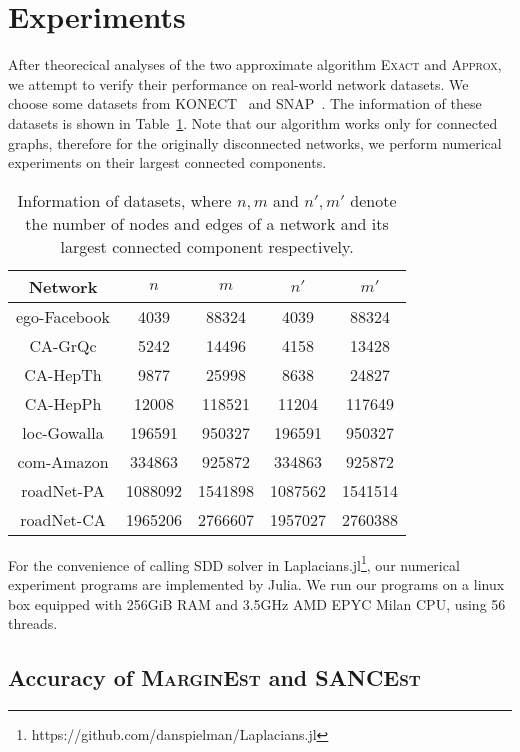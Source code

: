 \documentclass[sigconf]{acmart}
\begin{document}
\section{Experiments}

After theorecical analyses of the two approximate algorithm \textsc{Exact} and \textsc{Approx}, we attempt to verify their performance on real-world network datasets.
We choose some datasets from KONECT~\cite{Ku13} and SNAP~\cite{JuAn14}.
The information of these datasets is shown in Table~\ref{tab:info}.
Note that our algorithm works only for connected graphs, therefore for the originally disconnected networks, we perform numerical experiments on their largest connected components.
\begin{table}
    \caption{Information of datasets, where \(n,m\) and \(n',m'\) denote the number of nodes and edges of a network and its largest connected component respectively.}
    \label{tab:info}
    \begin{tabular}{ccccc}
        \toprule
        Network      & \(n\)   & \(m\)   & \(n'\)  & \(m'\)  \\
        \midrule
        ego-Facebook & 4039    & 88324   & 4039    & 88324   \\
        CA-GrQc      & 5242    & 14496   & 4158    & 13428   \\
        CA-HepTh     & 9877    & 25998   & 8638    & 24827   \\
        CA-HepPh     & 12008   & 118521  & 11204   & 117649  \\
        loc-Gowalla  & 196591  & 950327  & 196591  & 950327  \\
        com-Amazon   & 334863  & 925872  & 334863  & 925872  \\
        roadNet-PA   & 1088092 & 1541898 & 1087562 & 1541514 \\
        roadNet-CA   & 1965206 & 2766607 & 1957027 & 2760388 \\
        \bottomrule
    \end{tabular}
\end{table}

For the convenience of calling SDD solver in Laplacians.jl\footnote{https://github.com/danspielman/Laplacians.jl}, our numerical experiment programs are implemented by Julia. We run our programs on a linux box equipped with 256GiB RAM and 3.5GHz AMD EPYC Milan CPU, using 56 threads.

\subsection{Accuracy of \textsc{MarginEst} and \textsc{SANCEst}}
\end{document}
